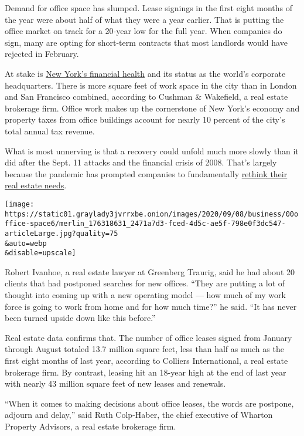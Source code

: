 Demand for office space has slumped. Lease signings in the first eight
months of the year were about half of what they were a year earlier.
That is putting the office market on track for a 20-year low for the
full year. When companies do sign, many are opting for short-term
contracts that most landlords would have rejected in February.

At stake is
\href{https://www.nytimes3xbfgragh.onion/2020/05/12/nyregion/coronavirus-work-from-home.html}{New
York's financial health} and its status as the world's corporate
headquarters. There is more square feet of work space in the city than
in London and San Francisco combined, according to Cushman \& Wakefield,
a real estate brokerage firm. Office work makes up the cornerstone of
New York's economy and property taxes from office buildings account for
nearly 10 percent of the city's total annual tax revenue.

What is most unnerving is that a recovery could unfold much more slowly
than it did after the Sept. 11 attacks and the financial crisis of 2008.
That's largely because the pandemic has prompted companies to
fundamentally
\href{https://www.nytimes3xbfgragh.onion/2020/08/20/style/office-culture.html}{rethink
their real estate needs}.

\texttt{[image: https://static01.graylady3jvrrxbe.onion/images/2020/09/08/business/00office-space6/merlin\_176318631\_2471a7d3-fced-4d5c-ae5f-798e0f3dc547-articleLarge.jpg?quality=75\\\&auto=webp\\\&disable=upscale]}

Robert Ivanhoe, a real estate lawyer at Greenberg Traurig, said he had
about 20 clients that had postponed searches for new offices. ``They are
putting a lot of thought into coming up with a new operating model ---
how much of my work force is going to work from home and for how much
time?'' he said. ``It has never been turned upside down like this
before.''

Real estate data confirms that. The number of office leases signed from
January through August totaled 13.7 million square feet, less than half
as much as the first eight months of last year, according to Colliers
International, a real estate brokerage firm. By contrast, leasing hit an
18-year high at the end of last year with nearly 43 million square feet
of new leases and renewals.

``When it comes to making decisions about office leases, the words are
postpone, adjourn and delay,'' said Ruth Colp-Haber, the chief executive
of Wharton Property Advisors, a real estate brokerage firm.

